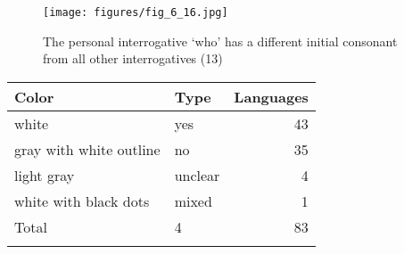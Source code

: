 \clearpage %
\begin{figure}
\texttt{[image: figures/fig\_6\_16.jpg]}
\caption{The personal interrogative ‘who’ has a different initial consonant from all other interrogatives (13)}
\label{fig:6:16}
\end{figure}

\begin{table}
\begin{tabularx}{\textwidth}{lQr}
\lsptoprule

\textbf{Color} & \textbf{Type} & \textbf{Languages}\\
\midrule
white & yes & 43\\
gray with white outline & no & 35\\
light gray & unclear & 4\\
white with black dots & mixed & 1\\
\midrule Total & 4 & 83\\
\lspbottomrule
\end{tabularx}
\end{table}